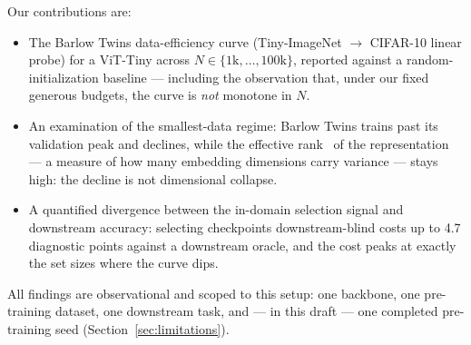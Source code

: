 Our contributions are:
\begin{itemize}
  \item The Barlow Twins data-efficiency curve (Tiny-ImageNet $\rightarrow$
        CIFAR-10 linear probe) for a ViT-Tiny across $N \in \{1\mathrm{k},
        \ldots, 100\mathrm{k}\}$, reported against a random-initialization
        baseline --- including the observation that, under our fixed
        generous budgets, the curve is \emph{not} monotone in $N$.
  \item An examination of the smallest-data regime: Barlow Twins trains
        past its validation peak and declines, while the effective
        rank~\cite{roy2007effective,jing2022dimensional} of the
        representation --- a measure of how many embedding dimensions carry
        variance --- stays high: the decline is not dimensional collapse.
  \item A quantified divergence between the in-domain selection signal and
        downstream accuracy: selecting checkpoints downstream-blind costs up
        to 4.7 diagnostic points against a downstream oracle, and the cost
        peaks at exactly the set sizes where the curve dips.
\end{itemize}
All findings are observational and scoped to this setup: one backbone, one
pre-training dataset, one downstream task, and --- in this draft --- one
completed pre-training seed (Section~\ref{sec:limitations}).

